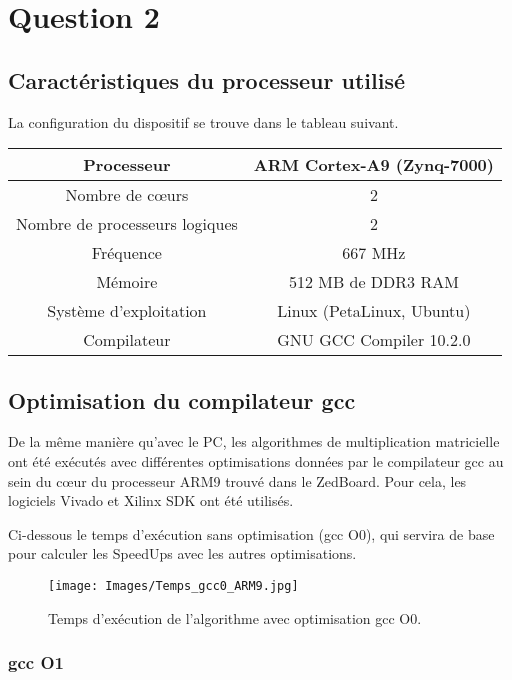 \documentclass[../CSC_5RO06_TA.tex]{subfiles}
\begin{document}
\section*{Question 2}

\subsection{Caractéristiques du processeur utilisé}

La configuration du dispositif se trouve dans le tableau suivant.

\begin{table}[h!]
\centering
\begin{tabular}{ |c|c| } 
\hline
Processeur & ARM Cortex-A9 (Zynq-7000) \\ \hline
Nombre de cœurs & 2 \\ \hline
Nombre de processeurs logiques & 2 \\ \hline
Fréquence & 667 MHz \\ \hline
Mémoire & 512 MB de DDR3 RAM \\ \hline
Système d'exploitation & Linux (PetaLinux, Ubuntu) \\ \hline
Compilateur & GNU GCC Compiler 10.2.0 \\ 
\hline
\end{tabular}
\end{table}

\subsection{Optimisation du compilateur gcc}

De la même manière qu'avec le PC, les algorithmes de multiplication matricielle ont été exécutés avec différentes optimisations données par le compilateur gcc au sein du cœur du processeur ARM9 trouvé dans le ZedBoard. Pour cela, les logiciels Vivado et Xilinx SDK ont été utilisés.

Ci-dessous le temps d'exécution sans optimisation (gcc O0), qui servira de base pour calculer les SpeedUps avec les autres optimisations.

\begin{figure}[H]
    \centering
    \texttt{[image: Images/Temps\_gcc0\_ARM9.jpg]}
    \caption{Temps d'exécution de l'algorithme avec optimisation gcc O0.}
    \label{fig:7}
\end{figure}

\subsubsection{gcc O1}
\end{document}
